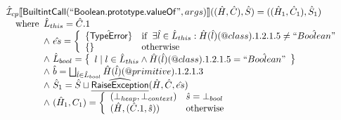 \documentclass{article}
\makeatletter
\newcommand{\SF}[1]{\mbox{\textsf{#1}}}
\newcommand{\wherec}[1]{{\rm where}\begin{array}[t]{l}#1\end{array}}
\newcommand{\ifc}[1]{{\rm if}\begin{array}[t]{l}#1\end{array}}
\newcommand{\owc}{{\rm otherwise}}
\newcommand{\aI}{\hat{\mathcal{I}}}
\newcommand{\set}[1]{\left\{\begin{array}{l}#1\end{array}\right\}}
\newcommand{\lbr}{\llbracket}
\newcommand{\rbr}{\rrbracket}
\newcommand{\ahf}[1]{\widehat{\underline{\sf #1}}}
\newcommand{\varprop}[1]{@#1}
\makeatother
\begin{document}
\[\begin{array}{l}
\aI _{cp}\lbr \SF{BuiltintCall}(``\SF{Boolean.prototype.valueOf}",args)\rbr((\hat{H},\hat{C}), \hat{S})
  = ((\hat{H}_1, \hat{C}_1), \hat{S}_1)\\
\quad\wherec{
  \hat{L}_{this} = \hat{C}.1\\
  \land\ \hat{es} = \left\{\begin{array}{ll}
      \{\hat{\SF{TypeError}}\} 
      & \ifc{\exists \hat{l} \in \hat{L}_{this}:
          \hat{H}(\hat{l})(\varprop{class}).1.2.1.5 \neq \hat{``Boolean"}}\\
      \set{} & \owc
    \end{array}\right.\\
  \land\ \hat{L}_{bool} = 
    \set{ l \mid l \in \hat{L}_{this} \land  \hat{H}(\hat{l})(\varprop{class}).1.2.1.5 = \hat{``Boolean"}}\\
  \land\ \hat{b} = \bigsqcup_{\hat{l} \in \hat{L}_{bool}} \hat{H}(\hat{l})(\varprop{primitive}).1.2.1.3\\
  \land\ \hat{S}_1 = \hat{S} \sqcup \ahf{RaiseException}(\hat{H}, \hat{C}, \hat{es})\\
  \land\ (\hat{H}_1, {C}_1) = \left\{\begin{array}{ll}
      (\bot_{heap}, \bot_{context}) & \hat{s} = \bot_{bool}\\
      (\hat{H}, (\hat{C}.1, \hat{s})) & \owc\\
    \end{array}\right.
  }\\
\end{array}
\]
\end{document}
